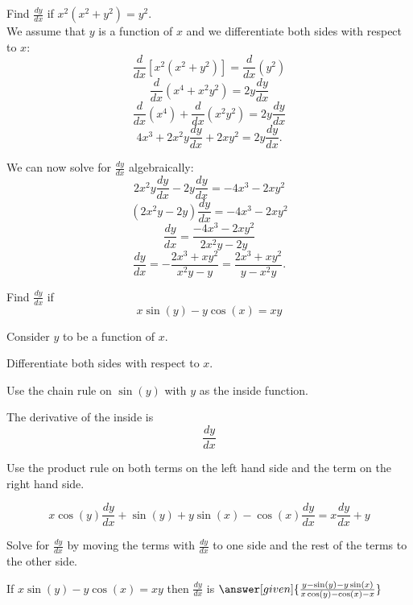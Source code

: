 \documentclass{ximera}
\begin{document}
\begin{example} %
Find  $\frac{dy}{dx}$ if $x^2(x^2 + y^2) =y^2$.\\
We assume that $y$ is a function of $x$ and we differentiate both 
sides with respect to $x$:
\[\frac{d}{dx}[x^2(x^2 + y^2)]  = \frac{d}{dx} (y^2 )\]
\[\frac{d}{dx}(x^4 + x^2y^2) = 2y\frac{dy}{dx}\]
\[\frac{d}{dx}(x^4) + \frac{d}{dx}(x^2y^2)  = 2y\frac{dy}{dx}\]
\[4x^3 + 2x^2y\frac{dy}{dx} + 2xy^2  = 2y\frac{dy}{dx}.\]

We can now solve for $\displaystyle{\frac{dy}{dx}}$ algebraically:
\[2x^2y\frac{dy}{dx} - 2y\frac{dy}{dx}= -4x^3 - 2xy^2\]
\[(2x^2y- 2y)\frac{dy}{dx}= -4x^3 - 2xy^2\]
\[\frac{dy}{dx}= \frac{-4x^3 - 2xy^2}{2x^2y- 2y}\]
\[\frac{dy}{dx}= -\frac{2x^3 + xy^2}{x^2y- y}= 
\frac{2x^3 + xy^2}{y - x^2y}.\]
\end{example}


\begin{center}
\begin{foldable}
\end{foldable}
\end{center}



\begin{problem} %
  Find $\frac{dy}{dx}$ if
  \[
  x\sin(y) - y\cos(x) = xy
  \]
  
	  
    \begin{hint}
      Consider $y$ to be a function of $x$.
    \end{hint}
		\begin{hint}
		  Differentiate both sides with respect to $x$.
		\end{hint}
    \begin{hint}
      Use the chain rule on $\sin(y)$ with $y$ as the inside function.
    \end{hint}
    \begin{hint}
      The derivative of the inside is 
      \[
      \frac{dy}{dx}
      \]
    \end{hint}
		\begin{hint}
      Use the product rule on both terms on the left hand side and the term on the right hand side.
    \end{hint}
		\begin{hint}
		  \[
			x\cos(y)\frac{dy}{dx} + \sin(y) + y\sin(x) - \cos(x)\frac{dy}{dx} = 
			x\frac{dy}{dx} + y
			\]
		\end{hint}
		\begin{hint}
		  Solve for $\frac{dy}{dx}$ by moving the terms with $\frac{dy}{dx}$ to one side and the 
			rest of the terms to the other side.
		\end{hint}
    
		If $x\sin(y) - y\cos(x) = xy$ then $\frac{dy}{dx}$ is
		 $\answer[given]{\frac{y - \sin(y) - y\sin(x)}{x\cos(y) -\cos(x) -x}}$
		
\end{problem}
\end{document}
